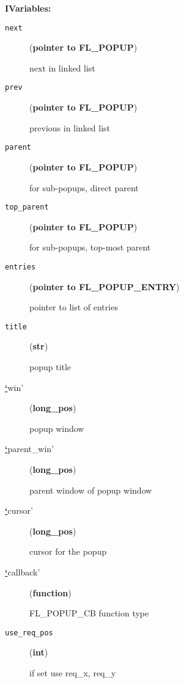 \textbf{IVariables:} %
\begin{description}
\item[{\texttt{next}}] \leavevmode (\textbf{pointer to FL\_POPUP})

next in linked list

\item[{\texttt{prev}}] \leavevmode (\textbf{pointer to FL\_POPUP})

previous in linked list

\item[{\texttt{parent}}] \leavevmode (\textbf{pointer to FL\_POPUP})

for sub-popups, direct parent

\item[{\texttt{top\_parent}}] \leavevmode (\textbf{pointer to FL\_POPUP})

for sub-popups, top-most parent

\item[{\texttt{entries}}] \leavevmode (\textbf{pointer to FL\_POPUP\_ENTRY})

pointer to list of entries

\item[{\texttt{title}}] \leavevmode (\textbf{str})

popup title

\item[{%
\hyperlink{id1}{\textbf{\color{red}`}}win'}] \leavevmode (\textbf{long\_pos})

popup window

\item[{%
\hyperlink{id3}{\textbf{\color{red}`}}parent\_win'}] \leavevmode (\textbf{long\_pos})

parent window of popup window

\item[{%
\hyperlink{id5}{\textbf{\color{red}`}}cursor'}] \leavevmode (\textbf{long\_pos})

cursor for the popup

\item[{%
\hyperlink{id7}{\textbf{\color{red}`}}callback'}] \leavevmode (\textbf{function})

FL\_POPUP\_CB function type

\item[{\texttt{use\_req\_pos}}] \leavevmode (\textbf{int})

if set use req\_x, req\_y


\end{description}
